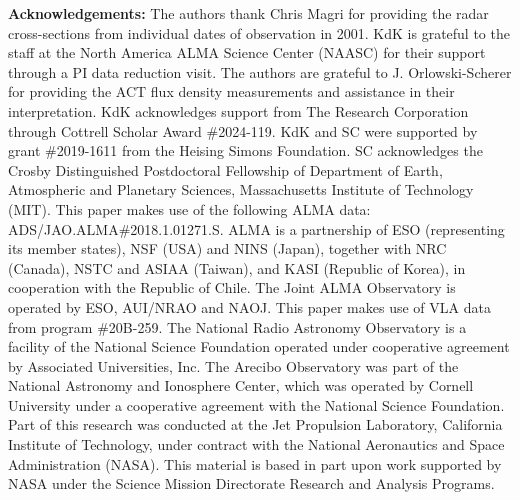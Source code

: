 \documentclass[]{aastex631}
\begin{document}
\begin{acknowledgments}
\textbf{Acknowledgements:} The authors thank Chris Magri for providing the radar cross-sections from individual dates of observation in 2001. KdK is grateful to the staff at the North America ALMA Science Center (NAASC) for their support through a PI data reduction visit. The authors are grateful to J. Orlowski-Scherer for providing the ACT flux density measurements and assistance in their interpretation. KdK acknowledges support from The Research Corporation through Cottrell Scholar Award \#2024-119. KdK and SC were supported by grant \#2019-1611 from the Heising Simons Foundation.  SC acknowledges the Crosby Distinguished Postdoctoral Fellowship of Department of Earth, Atmospheric and Planetary Sciences, Massachusetts Institute of Technology (MIT). This paper makes use of the following ALMA data: ADS/JAO.ALMA\#2018.1.01271.S. ALMA is a partnership of ESO (representing its member states), NSF (USA) and NINS (Japan), together with NRC (Canada), NSTC and ASIAA (Taiwan), and KASI (Republic of Korea), in cooperation with the Republic of Chile. The Joint ALMA Observatory is operated by ESO, AUI/NRAO and NAOJ. This paper makes use of VLA data from program \#20B-259. The National Radio Astronomy Observatory is a facility of the National Science Foundation operated under cooperative agreement by Associated Universities, Inc. The Arecibo Observatory was part of the National Astronomy and Ionosphere Center, which was operated by Cornell University under a cooperative agreement with the National Science Foundation. Part of this research was conducted at the Jet Propulsion Laboratory, California Institute of Technology, under contract with the National Aeronautics and Space Administration (NASA). This material is based in part upon work supported by NASA under the Science Mission Directorate Research and Analysis Programs.
\end{acknowledgments}

\clearpage

{}

\end{document}
